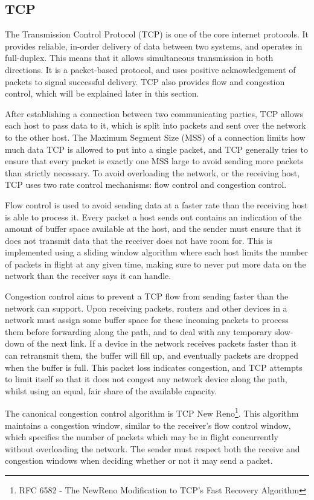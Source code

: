 \subsection{TCP}
\label{sec:bg:tcp}
The Transmission Control Protocol (TCP) is one of the core internet protocols.
It provides reliable, in-order delivery of data between two
systems, and operates in full-duplex. This means that it allows simultaneous
transmission in both directions. It is a packet-based
protocol, and uses positive acknowledgement of packets to signal successful
delivery. TCP also provides flow and congestion
control, which will be explained later in this section.

After establishing a connection between two communicating parties, TCP allows
each host to pass data to it, which is split into packets and sent over the
network to the other host. The Maximum Segment Size (MSS) of a connection limits
how much data TCP is allowed to put into a single packet, and TCP generally
tries to ensure that every packet is exactly one MSS large to avoid sending
more packets than strictly necessary. To avoid overloading the network, or
the receiving host, TCP uses two rate
control mechanisms: flow control and congestion control.

Flow control is used to
avoid sending data at a faster rate than the receiving host is able to process it.
Every packet a host sends out contains an indication of the amount of
buffer space available at the host, and the sender must ensure that it
does not transmit data that the receiver does not have room for. This is
implemented using a sliding window algorithm where each host limits the number
of packets in flight at any given time, making sure to never put more data on
the network than the receiver says it can handle.

Congestion control aims to prevent a TCP flow from sending faster than the
network can support. Upon receiving packets, routers and other devices in a
network must assign some buffer space for these incoming packets to process them
before forwarding along the path, and to deal with any temporary slow-down of the
next link. If a device in the network receives packets faster than it can
retransmit them, the buffer will fill up, and eventually packets are dropped
when the buffer is full. This packet loss indicates congestion, and TCP
attempts to limit itself so that it does not congest any network device along
the path, whilst using an equal, fair share of the available capacity.

The canonical congestion control algorithm is TCP New Reno\footnote{RFC 6582 -
The NewReno Modification to TCP's Fast Recovery Algorithm}. This algorithm
maintains a congestion window, similar to the receiver's flow control window,
which specifies the number of packets which may be in flight concurrently
without overloading the network. The sender must respect both the receive and
congestion windows when deciding whether or not it may send a packet.

